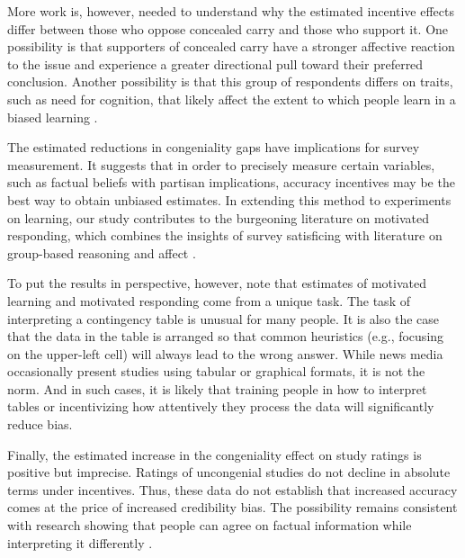\documentclass[12pt,letterpaper]{article}
\begin{document}
More work is, however, needed to understand why the estimated incentive effects differ between those who oppose concealed carry and those who support it. One possibility is that supporters of concealed carry have a stronger affective reaction to the issue and experience a greater directional pull toward their preferred conclusion. Another possibility is that this group of respondents differs on traits, such as need for cognition, that likely affect the extent to which people learn in a biased learning \citep[e.g.,][]{arceneaux2013}.

The estimated reductions in congeniality gaps have implications for survey measurement. It suggests that in order to precisely measure certain variables, such as factual beliefs with partisan implications, accuracy incentives may be the best way to obtain unbiased estimates. In extending this method to experiments on learning, our study contributes to the burgeoning literature on motivated responding, which combines the insights of survey satisficing with literature on group-based reasoning and affect \citep{bullock2015, prior2015}. 

To put the results in perspective, however, note that estimates of motivated learning and motivated responding come from a unique task. The task of interpreting a contingency table is unusual for many people. It is also the case that the data in the table is arranged so that common heuristics (e.g., focusing on the upper-left cell) will always lead to the wrong answer. While news media occasionally present studies using tabular or graphical formats, it is not the norm. And in such cases, it is likely that training people in how to interpret tables or incentivizing how attentively they process the data will significantly reduce bias. 

Finally, the estimated increase in the congeniality effect on study ratings is positive but imprecise. Ratings of uncongenial studies do not decline in absolute terms under incentives. Thus, these data do not establish that increased accuracy comes at the price of increased credibility bias. The possibility remains consistent with research showing that people can agree on factual information while interpreting it differently \citep[e.g.,][]{gaines2007, bisgaard2015}.

\clearpage

  
\clearpage


\end{document}
